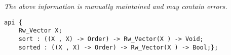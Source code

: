 \label{api:Rw\_Vector\_Sort}

{\tiny \it The above information is manually maintained and may contain errors.}
\begin{verbatim}
api {
    Rw_Vector X;
    sort : ((X , X) -> Order) -> Rw_Vector(X ) -> Void;
    sorted : ((X , X) -> Order) -> Rw_Vector(X ) -> Bool;};
\end{verbatim}
